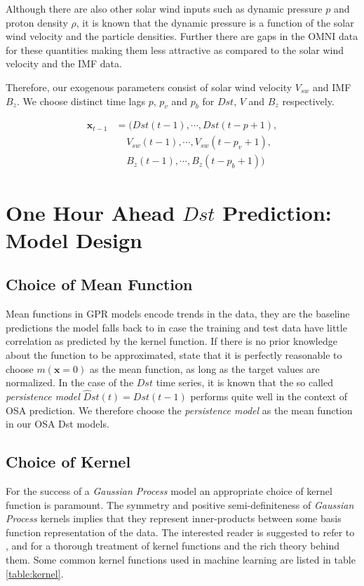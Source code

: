 \documentclass{article}
\begin{document}
Although there are also other solar wind inputs such as dynamic
pressure $p$ and proton density $\rho$, it is known that the dynamic
pressure  is a function of the solar wind velocity and the particle
densities. Further there are gaps in the OMNI data for these
quantities making them less attractive as compared to the solar wind
velocity and the IMF data.

Therefore, our exogenous parameters consist of solar wind velocity
$V_{sw}$ and IMF $B_z$. We choose distinct time lags $p$, $p_{v}$ and
$p_{b}$ for $Dst$, $V$ and $B_z$ respectively.

\begin{align*}
  \mathbf{x}_{t-1} & = (Dst(t-1), \cdots , Dst(t-p+1), \\
                   & \ \ \ \ \  V_{sw}(t-1), \cdots, V_{sw}(t-p_{v}+1),\\
                   & \ \ \ \ \  B_{z}(t-1), \cdots, B_{z}(t-p_{b}+1))
\end{align*}

\section{One Hour Ahead $Dst$ Prediction: Model Design}\label{sec:modeldesign}

\subsection{Choice of Mean Function}

Mean functions in GPR models encode trends in the data, they are the
baseline predictions the model falls back to in case the training and
test data have little correlation as predicted by the kernel
function. If there is no prior knowledge about the function to be
approximated, \citet{Rasmussen:2005:GPM:1162254} state that it is
perfectly reasonable to choose $m(\mathbf{x} = 0)$ as the mean
function, as long as the target values are normalized. In the case of
the $Dst$ time series, it is known that the so called
\emph{persistence model} $\hat{D}st(t) = Dst(t-1)$ performs quite well
in the context of OSA prediction. We therefore choose the
\emph{persistence model} as the mean function in our OSA Dst models.

\subsection{Choice of Kernel}

For the success of a \emph{Gaussian Process} model an appropriate
choice of kernel function is paramount. The symmetry and positive
semi-definiteness of \emph{Gaussian Process} kernels implies that they
represent inner-products between some basis function representation of
the data. The interested reader is suggested to refer to
\citet{Berlinet2004}, \citet{Scholkopf:2001:LKS:559923} and
\citet{hofmann2008} for a thorough treatment of kernel functions and
the rich theory behind them. Some common kernel functions used in
machine learning are listed in table \ref{table:kernel}.
\end{document}
